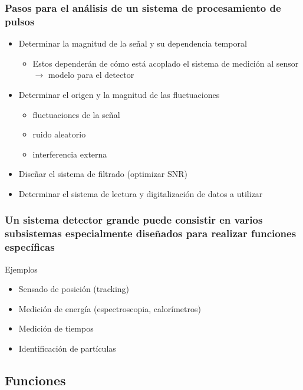 \documentclass{beamer}
\begin{document}
\begin{frame}
\frametitle{Pasos para el análisis de un sistema de procesamiento de pulsos}
\begin{exampleblock}{}
\begin{itemize}
\item Determinar la magnitud de la señal y su dependencia temporal 
\begin{itemize}
\item Estos dependerán de cómo está acoplado el sistema de medición al sensor
$\rightarrow$ \alert{modelo} para el detector
\end{itemize}
\item Determinar el origen y la magnitud de las fluctuaciones 
\begin{itemize}
\item fluctuaciones de la señal
\item ruido aleatorio
\item interferencia externa
\end{itemize}
\item Diseñar el sistema de filtrado (optimizar SNR)
\item Determinar el sistema de lectura y digitalización de datos a utilizar
\end{itemize}
\end{exampleblock}
\end{frame} 

\begin{frame}
\frametitle{Un sistema detector grande puede consistir en varios
subsistemas especialmente diseñados para realizar funciones específicas}
\begin{exampleblock}{Ejemplos}
\begin{itemize}
\item Sensado de posición (tracking)
\item Medición de energía (espectroscopia, calorímetros)
\item Medición de tiempos
\item Identificación de partículas
\end{itemize}
\end{exampleblock}
\end{frame} 

\subsection{Funciones}
\end{document}

